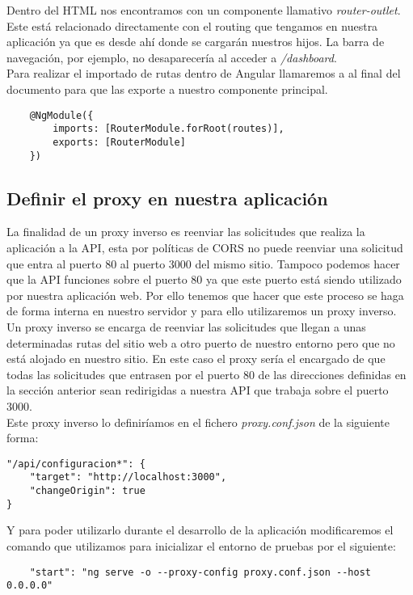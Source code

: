 Dentro del HTML nos encontramos con un componente llamativo \textit{router-outlet}. Este está relacionado directamente con el routing que tengamos en nuestra aplicación ya que es desde ahí donde se cargarán nuestros hijos. La barra de navegación, por ejemplo, no desaparecería al acceder a \textit{/dashboard}.
\\Para realizar el importado de rutas dentro de Angular llamaremos a \textit{\makeatletter@NgModule} al final del documento para que las exporte a nuestro componente principal.
\begin{verbatim}
    @NgModule({
        imports: [RouterModule.forRoot(routes)],
        exports: [RouterModule]
    })
\end{verbatim}

\subsection{Definir el proxy en nuestra aplicación}
La finalidad de un proxy inverso es reenviar las solicitudes que realiza la aplicación a la API, esta por políticas de CORS no puede reenviar una solicitud que entra al puerto 80 al puerto 3000 del mismo sitio. Tampoco podemos hacer que la API funciones sobre el puerto 80 ya que este puerto está siendo utilizado por nuestra aplicación web. Por ello tenemos que hacer que este proceso se haga de forma interna en nuestro servidor y para ello utilizaremos un proxy inverso.
\\Un proxy inverso se encarga de reenviar las solicitudes que llegan a unas determinadas rutas del sitio web a otro puerto de nuestro entorno pero que no está alojado en nuestro sitio. En este caso el proxy sería el encargado de que todas las solicitudes que entrasen por el puerto 80 de las direcciones definidas en la sección anterior sean redirigidas a nuestra API que trabaja sobre el puerto 3000.
\\Este proxy inverso lo definiríamos en el fichero \textit{proxy.conf.json} de la siguiente forma:
\begin{verbatim}
"/api/configuracion*": {
    "target": "http://localhost:3000",
    "changeOrigin": true
}
\end{verbatim}
Y para poder utilizarlo durante el desarrollo de la aplicación modificaremos el comando que utilizamos para inicializar el entorno de pruebas por el siguiente:
\begin{verbatim}
    "start": "ng serve -o --proxy-config proxy.conf.json --host 0.0.0.0"
\end{verbatim}
